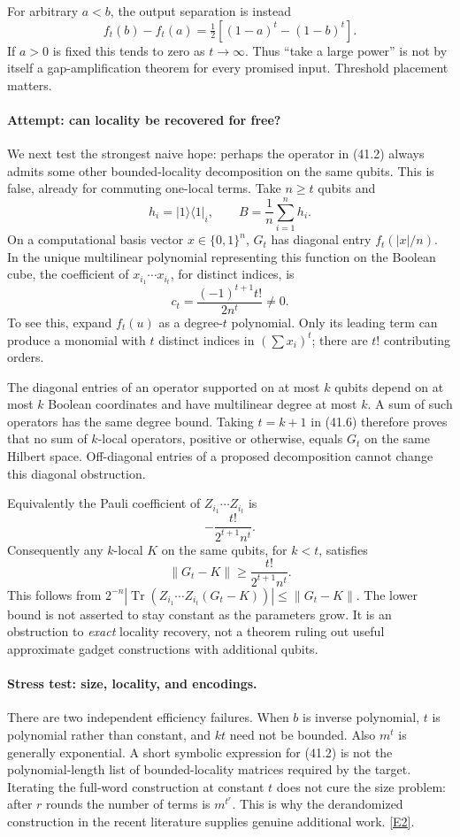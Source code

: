 \documentclass[11pt,a4paper]{article}
\newcommand{\eref}[2]{\hyperlink{extra:#1:#2}{[E#2]}}
\numberwithin{equation}{section}
\begin{document}
For arbitrary $a<b$, the output separation is instead
\[
 f_t(b)-f_t(a)=\tfrac12[(1-a)^t-(1-b)^t].            \tag{41.5}
\]
If $a>0$ is fixed this tends to zero as $t\to\infty$. Thus ``take a large
power'' is not by itself a gap-amplification theorem for every promised
input. Threshold placement matters.

\paragraph{Attempt: can locality be recovered for free?}
We next test the strongest naive hope: perhaps the operator in (41.2)
always admits some other bounded-locality decomposition on the same
qubits. This is false, already for commuting one-local terms.
Take $n\ge t$ qubits and
\[
 h_i=|1\rangle\langle1|_i,\qquad B=\frac1n\sum_{i=1}^n h_i.
\]
On a computational basis vector $x\in\{0,1\}^n$, $G_t$ has diagonal
entry $f_t(|x|/n)$. In the unique multilinear polynomial representing
this function on the Boolean cube, the coefficient of
$x_{i_1}\cdots x_{i_t}$, for distinct indices, is
\[
 c_t=\frac{(-1)^{t+1}t!}{2n^t}\ne0.               \tag{41.6}
\]
To see this, expand $f_t(u)$ as a degree-$t$ polynomial. Only its leading
term can produce a monomial with $t$ distinct indices in
$(\sum x_i)^t$; there are $t!$ contributing orders.

The diagonal entries of an operator supported on at most $k$ qubits
depend on at most $k$ Boolean coordinates and have multilinear degree at
most $k$. A sum of such operators has the same degree bound. Taking
$t=k+1$ in (41.6) therefore proves that no sum of $k$-local operators,
positive or otherwise, equals $G_t$ on the same Hilbert space.
Off-diagonal entries of a proposed decomposition cannot change this
diagonal obstruction.

Equivalently the Pauli coefficient of
$Z_{i_1}\cdots Z_{i_t}$ is
\[
 -\frac{t!}{2^{t+1}n^t}.
 \tag{41.7}
\]
Consequently any $k$-local $K$ on the same qubits, for $k<t$, satisfies
\[
 \|G_t-K\|\ge \frac{t!}{2^{t+1}n^t}.
\]
This follows from
$2^{-n}|\operatorname{Tr}(Z_{i_1}\cdots Z_{i_t}(G_t-K))|
\le\|G_t-K\|$. The lower bound is not asserted to stay constant as the
parameters grow. It is an obstruction to \emph{exact} locality recovery,
not a theorem ruling out useful approximate gadget constructions with
additional qubits.

\paragraph{Stress test: size, locality, and encodings.}
There are two independent efficiency failures. When $b$ is inverse
polynomial, $t$ is polynomial rather than constant, and $kt$ need not be
bounded. Also $m^t$ is generally exponential. A short symbolic expression
for (41.2) is not the polynomial-length list of bounded-locality matrices
required by the target. Iterating the full-word construction at constant
$t$ does not cure the size problem: after $r$ rounds the number of terms
is $m^{t^r}$. This is why the derandomized construction in the recent
literature supplies genuine additional work. \eref{41}{2}.
\end{document}
